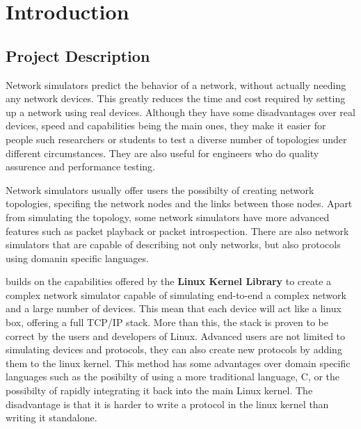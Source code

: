 \chapter{Introduction}
\label{chapter:intro}

\section{Project Description}
\label{sec:proj}

Network simulators predict the behavior of a network, without actually needing any network devices.
This greatly reduces the time and cost required by setting up a network using real devices. Although
they have some disadvantages over real devices, speed and capabilities being the main ones, they
make it easier for people such researchers or students to test a diverse number of topologies under
different circumstances. They are also useful for engineers who do quality assurence and performance
testing.

Network simulators usually offer users the possibilty of creating network topologies, specifing the
network nodes and the links between those nodes. Apart from simulating the topology, some network
simulators have more advanced features such as packet playback or packet introspection.
There are also network simulators that are capable of describing not only networks, but also protocols
using domanin specific languages.

\textbf{\project} builds on the capabilities offered by the \textbf{Linux Kernel Library} to create
a complex network simulator capable of simulating end-to-end a complex network and a large number
of devices. This mean that each device will act like a linux box, offering a full TCP/IP stack.
More than this, the stack is proven to be correct by the users and developers of Linux. Advanced
users are not limited to simulating devices and protocols, they can also create new protocols by
adding them to the linux kernel. This method has some advantages over domain specific languages such
as the posibilty of using a more traditional language, C, or the possibilty of rapidly integrating
it back into the main Linux kernel. The disadvantage is that it is harder to write a protocol
in the linux kernel than writing it standalone.


